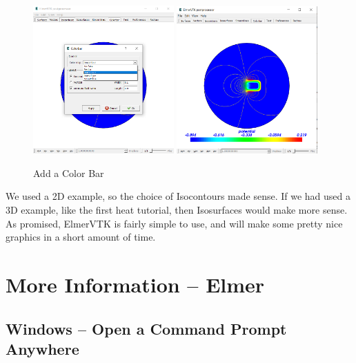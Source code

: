 \begin{figure}[H]
\begin{center}
\includegraphics[width=0.48\textwidth]{vtk-6}
\includegraphics[width=0.48\textwidth]{vtk-7}
\caption{Add a Color Bar}\label{fg:vtk-6}
\end{center}
\end{figure}

We used a 2D example, so the choice of Isocontours made sense.  If we had used a 3D example, like the first heat tutorial, then Isosurfaces would make more sense.\\

As promised, ElmerVTK is fairly simple to use, and will make some pretty nice graphics in a short amount of time.


\chapter{More Information -- Elmer}

\section{Windows -- Open a Command Prompt Anywhere}

